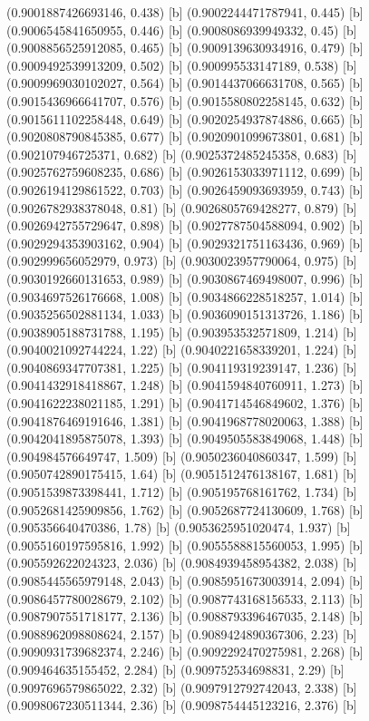 {{{(0.9001887426693146, 0.438) [b] 
(0.9002244471787941, 0.445) [b] 
(0.9006545841650955, 0.446) [b] 
(0.9008086939949332, 0.45) [b] 
(0.9008856525912085, 0.465) [b] 
(0.9009139630934916, 0.479) [b] 
(0.9009492539913209, 0.502) [b] 
(0.900995533147189, 0.538) [b] 
(0.9009969030102027, 0.564) [b] 
(0.9014437066631708, 0.565) [b] 
(0.9015436966641707, 0.576) [b] 
(0.9015580802258145, 0.632) [b] 
(0.9015611102258448, 0.649) [b] 
(0.9020254937874886, 0.665) [b] 
(0.9020808790845385, 0.677) [b] 
(0.9020901099673801, 0.681) [b] 
(0.902107946725371, 0.682) [b] 
(0.9025372485245358, 0.683) [b] 
(0.9025762759608235, 0.686) [b] 
(0.9026153033971112, 0.699) [b] 
(0.9026194129861522, 0.703) [b] 
(0.9026459093693959, 0.743) [b] 
(0.9026782938378048, 0.81) [b] 
(0.9026805769428277, 0.879) [b] 
(0.9026942755729647, 0.898) [b] 
(0.9027787504588094, 0.902) [b] 
(0.9029294353903162, 0.904) [b] 
(0.9029321751163436, 0.969) [b] 
(0.902999656052979, 0.973) [b] 
(0.9030023957790064, 0.975) [b] 
(0.9030192660131653, 0.989) [b] 
(0.9030867469498007, 0.996) [b] 
(0.9034697526176668, 1.008) [b] 
(0.9034866228518257, 1.014) [b] 
(0.9035256502881134, 1.033) [b] 
(0.9036090151313726, 1.186) [b] 
(0.9038905188731788, 1.195) [b] 
(0.903953532571809, 1.214) [b] 
(0.9040021092744224, 1.22) [b] 
(0.9040221658339201, 1.224) [b] 
(0.9040869347707381, 1.225) [b] 
(0.904119319239147, 1.236) [b] 
(0.9041432918418867, 1.248) [b] 
(0.9041594840760911, 1.273) [b] 
(0.9041622238021185, 1.291) [b] 
(0.9041714546849602, 1.376) [b] 
(0.9041876469191646, 1.381) [b] 
(0.9041968778020063, 1.388) [b] 
(0.9042041895875078, 1.393) [b] 
(0.9049505583849068, 1.448) [b] 
(0.904984576649747, 1.509) [b] 
(0.9050236040860347, 1.599) [b] 
(0.9050742890175415, 1.64) [b] 
(0.9051512476138167, 1.681) [b] 
(0.9051539873398441, 1.712) [b] 
(0.905195768161762, 1.734) [b] 
(0.9052681425909856, 1.762) [b] 
(0.9052687724130609, 1.768) [b] 
(0.905356640470386, 1.78) [b] 
(0.9053625951020474, 1.937) [b] 
(0.9055160197595816, 1.992) [b] 
(0.9055588815560053, 1.995) [b] 
(0.905592622024323, 2.036) [b] 
(0.9084939458954382, 2.038) [b] 
(0.9085445565979148, 2.043) [b] 
(0.9085951673003914, 2.094) [b] 
(0.9086457780028679, 2.102) [b] 
(0.9087743168156533, 2.113) [b] 
(0.9087907551718177, 2.136) [b] 
(0.9088793396467035, 2.148) [b] 
(0.9088962098808624, 2.157) [b] 
(0.9089424890367306, 2.23) [b] 
(0.9090931739682374, 2.246) [b] 
(0.9092292470275981, 2.268) [b] 
(0.909464635155452, 2.284) [b] 
(0.909752534698831, 2.29) [b] 
(0.9097696579865022, 2.32) [b] 
(0.9097912792742043, 2.338) [b] 
(0.9098067230511344, 2.36) [b] 
(0.9098754445123216, 2.376) [b] 
}}}
